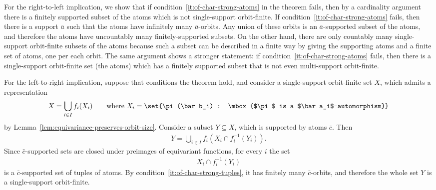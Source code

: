 {For the right-to-left implication, we show that if condition~\ref{it:of-char-strong-atoms} in the theorem fails, then by a cardinality argument there is a finitely supported subset of the atoms which is not single-support orbit-finite. If condition~\ref{it:of-char-strong-atoms} fails, then there is a support $\bar a$ such that the atoms have infinitely many $\bar a$-orbits. Any union of these orbits is an $\bar a$-supported subset of the atoms, and therefore the atoms have uncountably many finitely-supported subsets. On the other hand, there are only countably many single-support orbit-finite subsets of the atoms because such a subset can be described in a finite way by giving the supporting atoms and a finite set of atoms, one per each orbit. The same argument shows a stronger statement: if condition~\ref{it:of-char-strong-atoms} fails, then there is a single-support orbit-finite set (the atoms) which has a finitely supported subset that is not even multi-support orbit-finite.

For the left-to-right implication, suppose that conditions the theorem hold, and consider a single-support orbit-finite set $X$, which admits a representation 
	\begin{align*}
	X=	\bigcup_{i \in I} f_i(X_i) \qquad \mbox{where }X_i= \set{\pi(\bar b_i) : \mbox{$\pi$ is a $\bar a_i$-automorphism}}
	\end{align*}
	by Lemma~\ref{lem:equivariance-preserves-orbit-size}. Consider a subset $Y \subseteq X$, which is supported by atoms $\bar c$. Then 
	\begin{align*}
		Y = \bigcup_{i \in I} f_i(X_i \cap f_i^{-1}(Y_i)).
	\end{align*}
	Since $\bar c$-supported sets are closed under preimages of equivariant functions, for every $i$ the set 
	\begin{align*}
		X_i \cap f_i^{-1}(Y_i)
	\end{align*}
	is a $\bar c$-supported set of tuples of atoms. By condition~\ref{it:of-char-strong-tuples}, it has finitely many $\bar c$-orbits, and therefore the whole set $Y$ is a single-support orbit-finite.}

